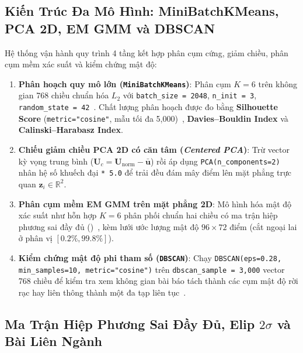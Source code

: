 \subsection{Kiến Trúc Đa Mô Hình: MiniBatchKMeans, PCA 2D, EM GMM và DBSCAN}
\label{sec:ch4_clustering_arch}

Hệ thống vận hành quy trình 4 tầng kết hợp phân cụm cứng, giảm chiều, phân cụm mềm xác suất và kiểm chứng mật độ:
\begin{enumerate}[label=\textbf{\arabic*.}]
  \item \textbf{Phân hoạch quy mô lớn (\texttt{MiniBatchKMeans})}: Phân cụm $K = 6$ trên không gian 768 chiều chuẩn hóa $L_2$ với \texttt{batch\_size = 2048}, \texttt{n\_init = 3}, \texttt{random\_state = 42}~\cite{macqueen1967some}. Chất lượng phân hoạch được đo bằng \textbf{Silhouette Score} (\texttt{metric="cosine"}, mẫu tối đa 5,000)~\cite{rousseeuw1987silhouettes}, \textbf{Davies--Bouldin Index} và \textbf{Calinski--Harabasz Index}.
  \item \textbf{Chiếu giảm chiều PCA 2D có căn tâm (\textit{Centered PCA})}: Trừ vector kỳ vọng trung bình ($\mathbf{U}_c = \mathbf{U}_{\text{norm}} - \bar{\mathbf{u}}$) rồi áp dụng \texttt{PCA(n\_components=2)} nhân hệ số khuếch đại \texttt{* 5.0} để trải đều đám mây điểm lên mặt phẳng trực quan $\mathbf{z}_i \in \mathbb{R}^2$.
  \item \textbf{Phân cụm mềm EM GMM trên mặt phẳng 2D}: Mô hình hóa mật độ xác suất như hỗn hợp $K = 6$ phân phối chuẩn hai chiều có ma trận hiệp phương sai đầy đủ ()~\cite{dempster1977maximum}, kèm lưới ước lượng mật độ $96 \times 72$ điểm (cắt ngoại lai ở phân vị $[0.2\%, 99.8\%]$).
  \item \textbf{Kiểm chứng mật độ phi tham số (\texttt{DBSCAN})}: Chạy \texttt{DBSCAN(eps=0.28, min\_samples=10, metric="cosine")} trên \texttt{dbscan\_sample = 3,000} vector 768 chiều để kiểm tra xem không gian bài báo tách thành các cụm mật độ rời rạc hay liên thông thành một đa tạp liên tục~\cite{ester1996density}.
\end{enumerate}

\subsection{\texorpdfstring{Ma Trận Hiệp Phương Sai Đầy Đủ, Elip $2\sigma$ và Bài Liên Ngành}{Ma Tran Hiep Phuong Sai Day Du, Elip 2-sigma va Bai Lien Nganh}}
\label{sec:ch4_gmm_math}

